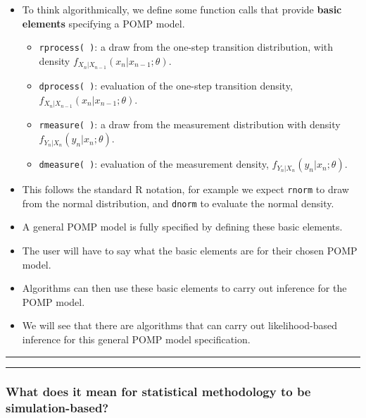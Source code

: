 \documentclass[]{article}
\begin{document}
\begin{itemize}
\item
  To think algorithmically, we define some function calls that provide
  \textbf{basic elements} specifying a POMP model.

  \begin{itemize}
  \item
    \texttt{rprocess(\ )}: a draw from the one-step transition
    distribution, with density \(f_{X_n|X_{n-1}}(x_n| x_{n-1};\theta)\).
  \item
    \texttt{dprocess(\ )}: evaluation of the one-step transition
    density, \(f_{X_n|X_{n-1}}(x_n| x_{n-1};\theta)\).
  \item
    \texttt{rmeasure(\ )}: a draw from the measurement distribution with
    density \(f_{Y_n|X_n}(y_n| x_n;\theta)\).
  \item
    \texttt{dmeasure(\ )}: evaluation of the measurement density,
    \(f_{Y_n|X_n}(y_n| x_n;\theta)\).
  \end{itemize}
\item
  This follows the standard R notation, for example we expect
  \texttt{rnorm} to draw from the normal distribution, and
  \texttt{dnorm} to evaluate the normal density.
\item
  A general POMP model is fully specified by defining these basic
  elements.
\item
  The user will have to say what the basic elements are for their chosen
  POMP model.
\item
  Algorithms can then use these basic elements to carry out inference
  for the POMP model.
\item
  We will see that there are algorithms that can carry out
  likelihood-based inference for this general POMP model specification.
\end{itemize}

\begin{center}\rule{0.5\linewidth}{\linethickness}\end{center}

\begin{center}\rule{0.5\linewidth}{\linethickness}\end{center}

\subsubsection{What does it mean for statistical methodology to be
simulation-based?}\label{what-does-it-mean-for-statistical-methodology-to-be-simulation-based}
\end{document}
